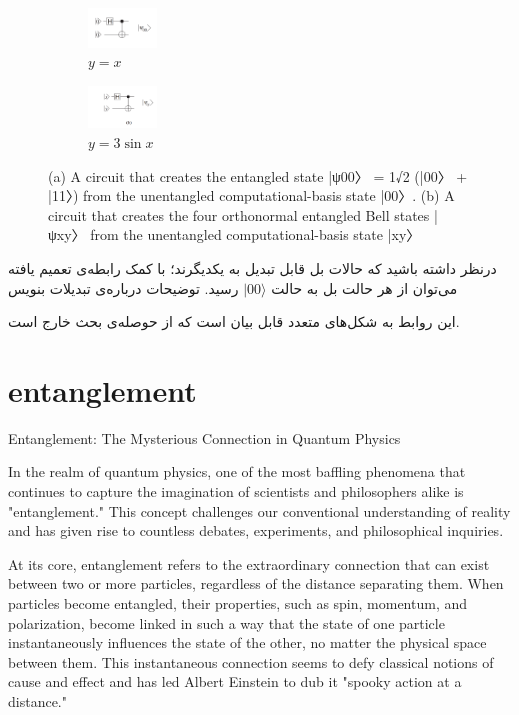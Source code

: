 \documentclass{book}
\begin{document}
\begin{figure}
	\centering
	\begin{subfigure}[b]{}
		\centering
		\includegraphics[width=0.2\textwidth]{psi00.png}
		\caption{$y=x$}
		\label{fig:y equals x}
	\end{subfigure}
	\hfill
	\begin{subfigure}[b]{}
		\centering
		\includegraphics[width=0.2\textwidth]{psixy.png}
		\caption{$y=3\sin x$}
		\label{fig:three sin x}
	\end{subfigure}
	\caption{(a) A circuit that creates the entangled state
		|ψ00〉 = 1√2
		(|00〉 + |11〉) from the unentangled computational-basis
		state |00〉. (b) A circuit that creates the four orthonormal entangled
		Bell states |ψxy〉 from the unentangled computational-basis state |xy〉}
	\label{fig:three graphs}
\end{figure}


درنظر داشته باشید که حالات بل قابل تبدیل به یکدیگرند؛ با کمک رابطه‌ی تعمیم یافته ‌می‌توان از هر حالت بل به حالت $\vert00 \rangle$ رسید.
توضیحات درباره‌ی تبدیلات بنویس

این روابط به شکل‌های متعدد قابل بیان است که از حوصله‌ی بحث خارج است.
\newpage






\section{entanglement}

Entanglement: The Mysterious Connection in Quantum Physics

In the realm of quantum physics, one of the most baffling phenomena that continues to capture the imagination of scientists and philosophers alike is "entanglement." This concept challenges our conventional understanding of reality and has given rise to countless debates, experiments, and philosophical inquiries.

At its core, entanglement refers to the extraordinary connection that can exist between two or more particles, regardless of the distance separating them. When particles become entangled, their properties, such as spin, momentum, and polarization, become linked in such a way that the state of one particle instantaneously influences the state of the other, no matter the physical space between them. This instantaneous connection seems to defy classical notions of cause and effect and has led Albert Einstein to dub it "spooky action at a distance."
\end{document}
